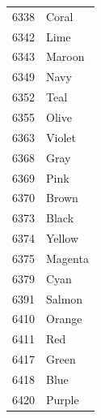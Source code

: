 \begin{table}[H]
\begin{tabular}{rl}
6338 & \color{Coral}Coral \\ 
6342 & \color{Lime}Lime \\ 
6343 & \color{Maroon}Maroon \\ 
6349 & \color{Navy}Navy \\ 
6352 & \color{Teal}Teal \\ 
6355 & \color{Olive}Olive \\ 
6363 & \color{Violet}Violet \\ 
6368 & \color{Gray}Gray \\ 
6369 & \color{Pink}Pink \\ 
6370 & \color{Brown}Brown \\ 
6373 & \color{Black}Black \\ 
6374 & \color{Yellow}Yellow \\ 
6375 & \color{Magenta}Magenta \\ 
6379 & \color{Cyan}Cyan \\ 
6391 & \color{Salmon}Salmon \\ 
6410 & \color{Orange}Orange \\ 
6411 & \color{Red}Red \\ 
6417 & \color{Green}Green \\ 
6418 & \color{Blue}Blue \\ 
6420 & \color{Purple}Purple \\ 
\bottomrule
\end{tabular}
\end{table}
\newpage 
